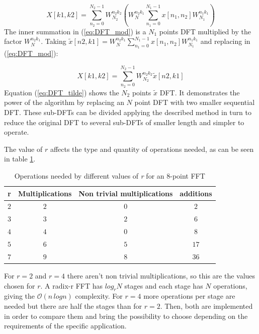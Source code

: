 \documentclass[conference]{IEEEtran}
\begin{document}
\begin{equation}
X[k1,k2]=\sum_{n_2=0}^{N_2-1}
W_{N_2}^{n_2k_2}\left(W_{N}^{n_2k_1}\sum_{n_1=0}^{N_1-1}x[n_1,n_2]W_{N_1}^{n_1k_1}\right)
\label{eq:DFT_mod}
\end{equation}
The inner summation in (\ref{eq:DFT_mod}) is a $N_1$ points DFT multiplied by the factor $W_{N}^{n_2k_1}$. 
Taking $\tilde{x}[n2,k1]=W_{N}^{n_2k_1}\sum_{n_1=0}^{N_1-1}x[n_1,n_2]W_{N_1}^{n_1k_1}$
and replacing in (\ref{eq:DFT_mod}):

\begin{equation}
X[k1,k2]=\sum_{n_2=0}^{N_2-1}
W_{N_2}^{n_2k_2}\tilde{x}[n2,k1]
\label{eq:DFT_tilde}
\end{equation}
Equation (\ref{eq:DFT_tilde}) shows the $N_2$ points $\tilde{x}$ DFT. It demonstrates the power of the algorithm by replacing an $N$ point DFT
with two smaller sequential DFT. These sub-DFTs can be divided applying the described method in turn to reduce the original DFT to 
several sub-DFTs of smaller length and simpler to operate.

The value of $r$ affects the type and quantity of operations needed, as can
be seen in table \ref{table:FFT_oper}.

\begin{table}[h]
\centering
\caption{Operations needed by different values of \textit{r}  for an 8-point FFT}
\begin{tabular}{c c c c}
\textbf{r} & \textbf{Multiplications} & \textbf{Non trivial multiplications} &
\textbf{additions} \\ \hline 
$2$ & $2$ & $0$ & $2$ \\
$3$ & $3$ & $2$ & $6$ \\
$4$ & $4$ & $0$ & $8$ \\
$5$ & $6$ & $5$ & $17$ \\
$7$ & $9$ & $8$ & $36$ \\ \hline
\end{tabular}
\label{table:FFT_oper}
\end{table}
 
For $r=2$ and $r=4$ there aren't non trivial multiplications, so this are the values chosen for $r$.
A radix-r FFT has $log_rN$ stages and each stage has $N$ operations, giving the $\mathcal{O}(n \, log n)$ complexity. 
For $r=4$ more operations per stage are needed but there are
half the stages than for $r=2$. Then, both are implemented in order to compare them and bring the possibility to choose
depending on the requirements of the specific application.
\end{document}
